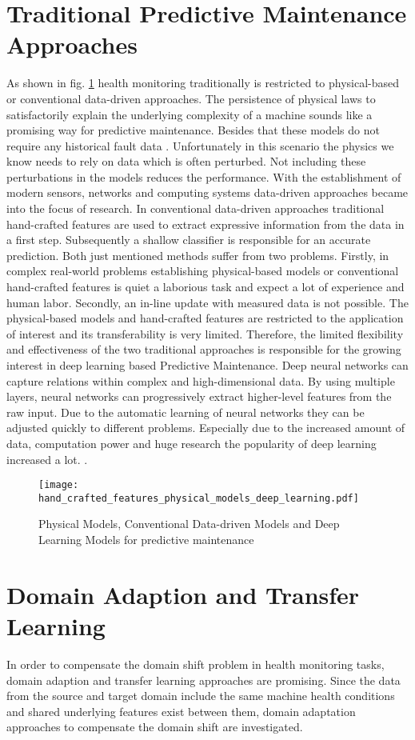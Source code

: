 \section{Traditional Predictive Maintenance Approaches}
As shown in fig. \ref{fig:hand_crafted_features_physical_models_deep_learning} health monitoring traditionally is restricted to physical-based or conventional data-driven approaches. The persistence of  physical laws to satisfactorily explain the underlying complexity of a machine sounds like a promising way for predictive maintenance. Besides that these models do not require any historical fault data \cite{AN201942}. Unfortunately in this scenario the physics we know needs to rely on data which is often perturbed. Not including these perturbations in the models reduces the performance. With the establishment of modern sensors, networks and computing systems data-driven approaches became into the focus of research. In conventional data-driven approaches traditional hand-crafted features are used to extract expressive information from the data in a first step. Subsequently a shallow classifier is responsible for an accurate prediction. Both just mentioned methods suffer from two problems. Firstly, in complex real-world problems establishing physical-based models or conventional hand-crafted features is quiet a laborious task and expect a lot of experience and human labor. Secondly, an in-line update with measured data is not possible. The physical-based models and hand-crafted features are restricted to the application of interest and its transferability is very limited. Therefore, the limited flexibility and effectiveness of the two traditional approaches is responsible for the growing interest in deep learning based Predictive Maintenance. Deep neural networks can capture relations within complex and high-dimensional data. By using multiple layers, neural networks can progressively extract higher-level features from the raw input. Due to the automatic learning of neural networks they can be adjusted quickly to different problems. Especially due to the increased amount of data, computation power and huge research the popularity of deep learning increased a lot.  \cite{ZHAO2019213} \cite{AZAMFAR2020103932}. 

\begin{figure}[H]
  \centering
  \texttt{[image: hand\_crafted\_features\_physical\_models\_deep\_learning.pdf]}
  \caption {Physical Models, Conventional Data-driven Models and Deep Learning Models for predictive maintenance \cite{ZHAO2019213}} \label{fig:hand_crafted_features_physical_models_deep_learning}
\end{figure}

\section{Domain Adaption and Transfer Learning}
In order to compensate the domain shift problem in health monitoring tasks, domain adaption and transfer learning approaches are promising. Since the data from the source and target domain include the same machine health conditions and shared underlying features exist between them, domain adaptation approaches to compensate the domain shift are investigated. 